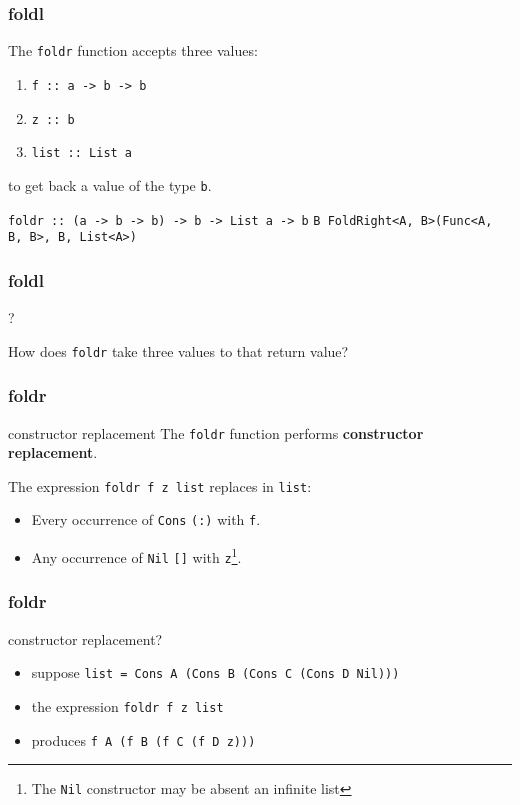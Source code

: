 \begin{frame}
\frametitle{foldl}
The \lstinline[basicstyle=\ttfamily]$foldr$ function accepts three values:
\begin{enumerate}
\item \lstinline[basicstyle=\ttfamily]$f :: a -> b -> b$
\item \lstinline[basicstyle=\ttfamily]$z :: b$
\item \lstinline[basicstyle=\ttfamily]$list :: List a$
\end{enumerate}
to get back a value of the type \lstinline[basicstyle=\ttfamily]$b$.

\hrulefill

\lstinline[basicstyle=\ttfamily]$foldr :: (a -> b -> b) -> b -> List a -> b$
\lstinline[basicstyle=\ttfamily]$B FoldRight<A, B>(Func<A, B, B>, B, List<A>)$
\end{frame}

\begin{frame}
\frametitle{foldl}
\begin{block}{?}
\begin{center}
How does \lstinline[basicstyle=\ttfamily]$foldr$ take three values to that return value?
\end{center}
\end{block}
\end{frame}

\begin{frame}
\frametitle{foldr}
\begin{block}{constructor replacement}
The \lstinline[basicstyle=\ttfamily]$foldr$ function performs \textbf{constructor replacement}.
\end{block}
The expression \lstinline[basicstyle=\ttfamily]$foldr f z list$ replaces in \lstinline[basicstyle=\ttfamily]$list$:
\begin{itemize}
\item Every occurrence of \lstinline{Cons} \lstinline[basicstyle=\ttfamily]$(:)$ with \lstinline[basicstyle=\ttfamily]$f$.
\item Any occurrence of \lstinline{Nil} \lstinline[basicstyle=\ttfamily]$[]$ with \lstinline[basicstyle=\ttfamily]$z$\footnote{The \lstinline{Nil} constructor may be absent \textemdash an infinite list}.
\end{itemize}
\end{frame}

\begin{frame}
\frametitle{foldr}
\begin{block}{constructor replacement?}
\small
\begin{itemize}
\item suppose \lstinline[basicstyle=\ttfamily]$list = Cons A (Cons B (Cons C (Cons D Nil)))$
\item the expression \lstinline[basicstyle=\ttfamily, mathescape]!foldr f z list!
\item produces \lstinline[basicstyle=\ttfamily]$f A (f B (f C (f D z)))$
\end{itemize}
\end{block}
\end{frame}


